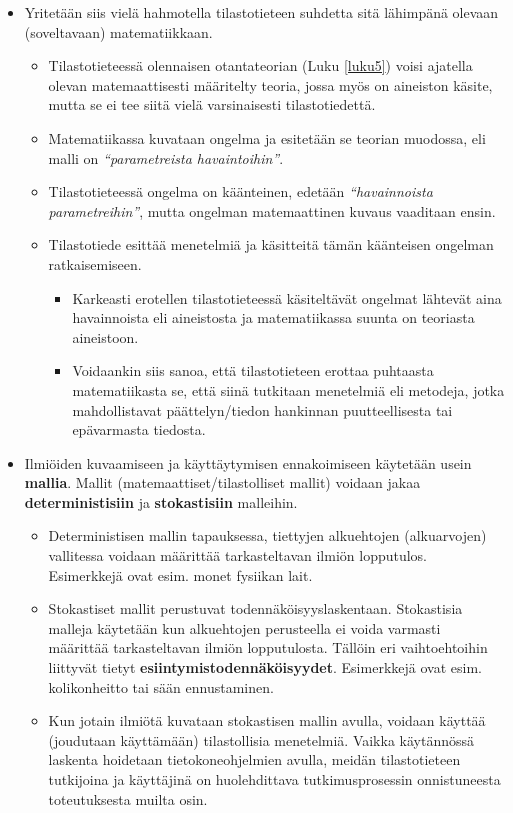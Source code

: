 \documentclass[
]{book}
\providecommand{\tightlist}{%
  \setlength{\itemsep}{0pt}\setlength{\parskip}{0pt}}
\begin{document}
\begin{itemize}
\tightlist
\item
  Yritetään siis vielä hahmotella tilastotieteen suhdetta sitä lähimpänä olevaan (soveltavaan) matematiikkaan.

  \begin{itemize}
  \tightlist
  \item
    Tilastotieteessä olennaisen otantateorian (Luku \ref{luku5}) voisi ajatella olevan matemaattisesti määritelty teoria, jossa myös on aineiston käsite, mutta se ei tee siitä vielä varsinaisesti tilastotiedettä.
  \item
    Matematiikassa kuvataan ongelma ja esitetään se teorian muodossa, eli malli on \emph{``parametreista havaintoihin''}.
  \item
    Tilastotieteessä ongelma on käänteinen, edetään \emph{``havainnoista parametreihin''}, mutta ongelman matemaattinen kuvaus vaaditaan ensin.
  \item
    Tilastotiede esittää menetelmiä ja käsitteitä tämän käänteisen ongelman ratkaisemiseen.

    \begin{itemize}
    \tightlist
    \item
      Karkeasti erotellen tilastotieteessä käsiteltävät ongelmat lähtevät aina havainnoista eli aineistosta ja matematiikassa suunta on teoriasta aineistoon.
    \item
      Voidaankin siis sanoa, että tilastotieteen erottaa puhtaasta matematiikasta se, että siinä tutkitaan menetelmiä eli metodeja, jotka mahdollistavat päättelyn/tiedon hankinnan puutteellisesta tai epävarmasta tiedosta.
    \end{itemize}
  \end{itemize}
\item
  Ilmiöiden kuvaamiseen ja käyttäytymisen ennakoimiseen käytetään usein \textbf{mallia}. Mallit (matemaattiset/tilastolliset mallit) voidaan jakaa \textbf{deterministisiin} ja \textbf{stokastisiin} malleihin.

  \begin{itemize}
  \tightlist
  \item
    Deterministisen mallin tapauksessa, tiettyjen alkuehtojen (alkuarvojen) vallitessa voidaan määrittää tarkasteltavan ilmiön lopputulos. Esimerkkejä ovat esim. monet fysiikan lait.
  \item
    Stokastiset mallit perustuvat todennäköisyyslaskentaan. Stokastisia malleja käytetään kun alkuehtojen perusteella ei voida varmasti määrittää tarkasteltavan ilmiön lopputulosta. Tällöin eri vaihtoehtoihin liittyvät tietyt \textbf{esiintymistodennäköisyydet}. Esimerkkejä ovat esim. kolikonheitto tai sään ennustaminen.
  \item
    Kun jotain ilmiötä kuvataan stokastisen mallin avulla, voidaan käyttää (joudutaan käyttämään) tilastollisia menetelmiä. Vaikka käytännössä laskenta hoidetaan tietokoneohjelmien avulla, meidän tilastotieteen tutkijoina ja käyttäjinä on huolehdittava tutkimusprosessin onnistuneesta toteutuksesta muilta osin.
  \end{itemize}
\end{itemize}
\end{document}
